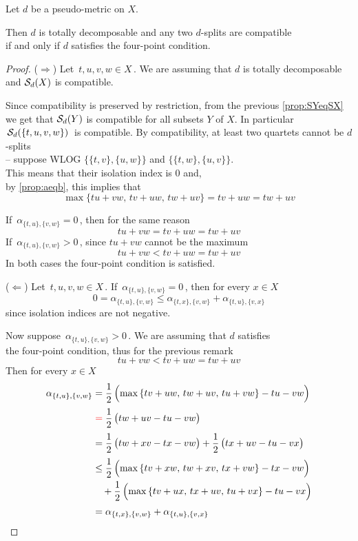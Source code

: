 \documentclass[./main.tex]{subfiles}
\begin{document}
\begin{corollary}[{\cites[Corollary 7]{BD92a}}] \label{cor:cor7}
    Let $d$ be a pseudo-metric on $X$.

    Then $d$ is totally decomposable and any two $d$-splits are compatible \\
    \bsp if and only if $d$ satisfies the four-point condition.
\end{corollary}
\begin{proof}
    ($\Rightarrow$) Let $\, t,u,v,w \in X \,$. We are assuming that $d$ is totally decomposable and ${\mathcal{S}}_d(X)$ is compatible.
    
    Since compatibility is preserved by restriction, from the previous \autoref{prop:SYeqSX} we get that ${\mathcal{S}}_d(Y)$ is compatible for all subsets $Y$ of $X$. In particular $\, {\mathcal{S}}_d(\{t,u,v,w\}) \,$ is compatible.
\clearpage
    By compatibility, at least two quartets cannot be $d$-splits \\[1pt]
    -- suppose WLOG $\bigl\{ \{t,v\},\{u,w\} \bigr\}$ and $\bigl\{ \{t,w\},\{u,v\} \bigr\}$. \\[2pt]
    This means that their isolation index is $0$ and, \\
    \bsp by \autoref{prop:aeqb}, this implies that
    \[ \max {\{ tu + vw,\, tv + uw,\, tw + uv \}} = tv + uw = tw + uv \]

    If $\, \alpha_{\{t,u\},\{v,w\}} = 0 \,$, then for the same reason
    \[ tu + vw = tv + uw = tw + uv \]
    If $\, \alpha_{\{t,u\},\{v,w\}} > 0 \,$, since $tu + vw$ cannot be the maximum
    \[ tu + vw < tv + uw = tw + uv \]
    In both cases the four-point condition is satisfied. \bigskip \bigskip

    ($\Leftarrow$) Let $\, t,u,v,w \in X \,$. If $\, \alpha_{\{t,u\},\{v,w\}} = 0 \,$, then for every $x \in X$
    \[ 0 = \alpha_{\{t,u\},\{v,w\}} \leq \alpha_{\{t,x\},\{v,w\}} + \alpha_{\{t,u\},\{v,x\}} \]
    since isolation indices are not negative.
    
    Now suppose $\, \alpha_{\{t,u\},\{v,w\}} > 0 \,$. We are assuming that $d$ satisfies \\[1pt]
    the four-point condition, thus for the previous remark
    \[ tu + vw < tv + uw = tw + uv \]
    Then for every $x \in X$
    \begin{align*}
        \alpha_{\{t,u\},\{v,w\}} &= \frac{1}{2}\, \Bigl( \max {\{ tv + uw,\, tw + uv,\, tu + vw \}} - tu - vw \Bigr) \\[2pt]
        &\mathcolor{red}{=} \frac{1}{2}\, \bigl( tw + uv - tu - vw \bigr) \\[2pt]
        &= \frac{1}{2}\, \bigl( tw + xv - tx - vw \bigr) + \frac{1}{2}\, \bigl( tx + uv - tu - vx \bigr) \\[2pt]
        &\leq \frac{1}{2}\, \Bigl( \max {\{ tv + xw,\, tw + xv,\, tx + vw \}} - tx - vw \Bigr) \\
        &\quad + \frac{1}{2}\, \Bigl( \max {\{ tv + ux,\, tx + uv,\, tu + vx \}} - tu - vx \Bigr) \\[2pt]
        &= \alpha_{\{t,x\},\{v,w\}} + \alpha_{\{t,u\},\{v,x\}}
    \end{align*}


\end{proof}
\end{document}
